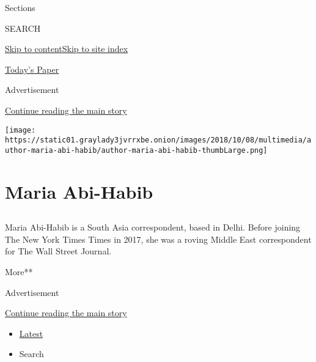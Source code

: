 Sections

SEARCH

\protect\hyperlink{site-content}{Skip to
content}\protect\hyperlink{site-index}{Skip to site index}

\href{https://myaccount.nytimes3xbfgragh.onion/auth/login?response_type=cookie\&client_id=vi}{}

\href{https://www.nytimes3xbfgragh.onion/section/todayspaper}{Today's
Paper}

Advertisement

\protect\hyperlink{after-top}{Continue reading the main story}

\texttt{[image: https://static01.graylady3jvrrxbe.onion/images/2018/10/08/multimedia/author-maria-abi-habib/author-maria-abi-habib-thumbLarge.png]}

\hypertarget{maria-abi-habib}{%
\section{Maria Abi-Habib}\label{maria-abi-habib}}

\subsection{}

Maria Abi-Habib is a South Asia correspondent, based in Delhi. Before
joining The New York Times Times in 2017, she was a roving Middle East
correspondent for The Wall Street Journal.

More**

Advertisement

\protect\hyperlink{after-mid1}{Continue reading the main story}

\begin{itemize}
\tightlist
\item
  \protect\hyperlink{stream-panel}{Latest}
\item
  Search
\end{itemize}

